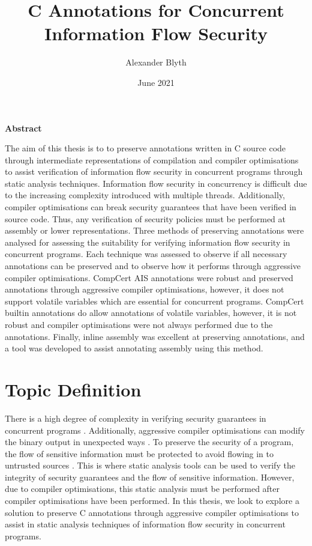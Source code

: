 \documentclass[12pt, a4paper]{report}
\title{C Annotations for Concurrent Information Flow Security}
\author{Alexander Blyth}
\date{June 2021}
\begin{document}
\maketitle

\tableofcontents

\clearpage
\begin{center}
    \large{\textbf{Abstract}}
\end{center}
The aim of this thesis is to to preserve annotations written in C source code through intermediate representations of compilation and compiler optimisations to assist verification of information flow security in concurrent programs through static analysis techniques. Information flow security in concurrency is difficult due to the increasing complexity introduced with multiple threads. Additionally, compiler optimisations can break security guarantees that have been verified in source code. Thus, any verification of security policies must be performed at assembly or lower representations. Three methods of preserving annotations were analysed for assessing the suitability  for verifying information flow security in concurrent programs. Each technique was assessed to observe if all necessary annotations can be preserved and to observe how it performs through aggressive compiler optimisations. CompCert AIS annotations were robust and preserved annotations through aggressive compiler optimisations, however, it does not support volatile variables which are essential for concurrent programs. CompCert builtin annotations do allow annotations of volatile variables, however, it is not robust and compiler optimisations were not always performed due to the annotations. Finally, inline assembly was excellent at preserving annotations, and a tool was developed to assist annotating assembly using this method.

\chapter{Topic Definition}
There is a high degree of complexity in verifying security guarantees in concurrent programs \cite{mantel2014noninterference}\cite{smith2019value}\cite{vaughan2012secure}. Additionally, aggressive compiler optimisations can modify the binary output in unexpected ways \cite{d2015correctness}. To preserve the security of a program, the flow of sensitive information must be protected to avoid flowing in to untrusted sources \cite{balliu2014logics}. This is where static analysis tools can be used to verify the integrity of security guarantees and the flow of sensitive information. However, due to compiler optimisations, this static analysis must be performed after compiler optimisations have been performed. In this thesis, we look to explore a solution to preserve C annotations through aggressive compiler optimisations to assist in static analysis techniques of information flow security in concurrent programs.
\end{document}
